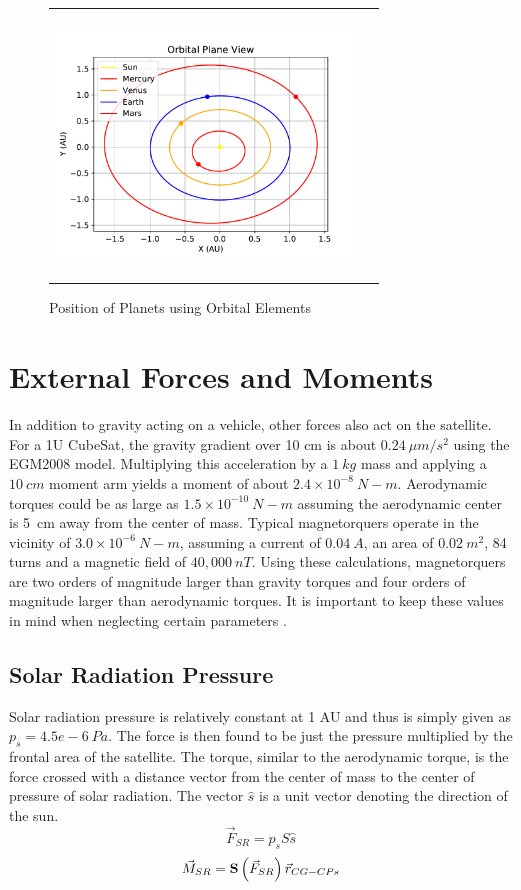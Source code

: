 \documentclass{article}
\begin{document}
\begin{figure}[H]
\begin{center}
\begin{tabular}{cc}
  \includegraphics[height=70mm, width=80mm]{Figures/inner_planets_top_down.pdf}\\
  \end{tabular}
  \end{center}
  \caption{Position of Planets using Orbital Elements}
\end{figure}

\section{External Forces and Moments}

In addition to gravity acting on a vehicle, other forces also act
on the satellite. For a 1U CubeSat, the gravity gradient over 10 cm is about
$0.24~\mu m/s^2$ using the EGM2008 model. Multiplying this 
acceleration by a $1~kg$ mass and applying a $10~cm$ moment arm yields
a moment of about $2.4 \times 10^{-8}~N-m$. Aerodynamic torques could
be as large as $1.5 \times 10^{-10}~N-m$ assuming the aerodynamic
center is 5~cm away from the center of mass. Typical magnetorquers operate
in the vicinity of $3.0 \times 10^{-6}~N-m$, assuming a current of $0.04~A$, an area of
$0.02~m^2$, 84 turns and a magnetic field of $40,000~nT$. Using
these calculations, magnetorquers are two orders of magnitude
larger than gravity torques and four orders of magnitude larger than
aerodynamic torques. It is important to keep these values in mind when
neglecting certain parameters
\cite{Radiation,AndersonD,Density_Model}.

\subsection{Solar Radiation Pressure}

Solar radiation pressure is relatively constant at 1 AU and thus is
simply given as $p_s=4.5e-6~Pa$. The force is then found to be just
the pressure multiplied by the frontal area of the satellite. The
torque, similar to the aerodynamic torque, is the force crossed with a
distance vector from the center of mass to the center of pressure of
solar radiation. The vector $\hat{s}$ is a unit vector denoting the
direction of the sun.
\begin{equation}
  \vec{F}_{SR} = p_s S \hat{s}
  \end{equation}
\begin{equation}
    \vec{M}_{SR} = {\bf S} \left( \vec{F}_{SR} \right) \vec{r}_{CG-CPs}
\end{equation}
\end{document}
